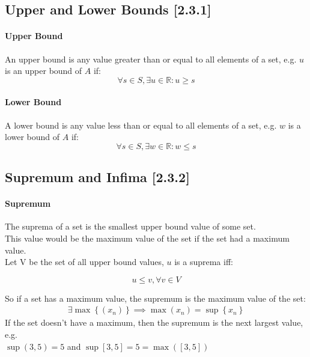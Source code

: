 \documentclass[class=article, crop=false]{standalone}
\begin{document}
\subsection{Upper and Lower Bounds [2.3.1]}
\paragraph{Upper Bound}
An upper bound is any value greater than or equal to all elements of a set, e.g. $u$ is an upper bound of $A$ if: \\

\begin{equation}
  \forall s \in S, \exists u \in \mathbb{R} : u \geq s
  \label{upperdef}
\end{equation}


\paragraph{Lower Bound}
A lower bound is any value less than or equal to all elements of a set, e.g. $w$ is a lower bound of $A$ if: \\

 \begin{equation}
 \forall s \in S, \exists w \in \mathbb{R} : w \leq s
 \label{lowerdef}
\end{equation}


\subsection{Supremum and Infima [2.3.2]}
\paragraph{Supremum}
The suprema of a set is the smallest upper bound value of some set.\\ 
This value would be the maximum value of the set if the set had a maximum value.\\
Let V be the set of all upper bound values, $u$ is a suprema iff:

\begin{equation}
 u \leq v, \forall v \in V 
 \label{supdef}
\end{equation}

So if a set has a maximum value, the supremum is the maximum value of the set:
\begin{align}
  \exists \max\left\{ \left( x_n \right) \right\} \implies \max(x_n) = \sup \left\{ x_n \right\}
  \label{maxassup}
\end{align}
If the set doesn't have a maximum, then the supremum is the next largest value, e.g.\\
$\sup \left( 3, 5 \right) = 5$ and $\sup \left[ 3, 5 \right] = 5 = \max \left( \left[ 3, 5 \right] \right)$  
\end{document}
